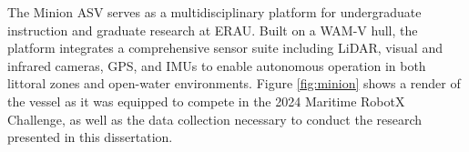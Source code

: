 \documentclass{erauthesis}
\begin{document}





The Minion \Ac{ASV} serves as a multidisciplinary platform for undergraduate instruction and graduate research at \ac{ERAU}.
Built on a \ac{WAM-V} hull, the platform integrates a comprehensive sensor suite including \ac{LiDAR}, visual and infrared cameras, \ac{GPS}, and \acp{IMU} to enable autonomous operation in both littoral zones and open-water environments.
Figure \ref{fig:minion} shows a render of the vessel as it was equipped to compete in the 2024 Maritime RobotX Challenge, as well as the data collection necessary to conduct the research presented in this dissertation.
\end{document}
